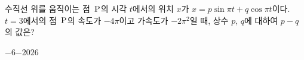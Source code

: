 수직선 위를 움직이는 점~$\mathrm{P}$의 시각 $t$에서의 위치 $x$가 $x=p\sin\pi t+q\cos\pi t$이다. $t=3$에서의 점~$\mathrm{P}$의 속도가 $-4\pi$이고 가속도가 $-2\pi^2$일 때, 상수 $p$, $q$에 대하여 $p-q$의 값은?
\begin{choices32}{$-6$}{$-2$}{$0$}{$2$}{$6$}\end{choices32}
